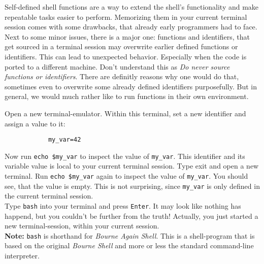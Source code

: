
\begin{challenge}

    \begin{chadescription}
        Self-defined shell functions are a way to extend the shell's functionality and make repeatable tasks easier to perform.
        Memorizing them in your current terminal session comes with some drawbacks, that already early programmers had to face.
        Next to some minor issues, there is a major one: functions and identifiers, that get sourced in a terminal session may overwrite earlier defined functions or identifiers.
        This can lead to unexpected behavior.
        Especially when the code is ported to a different machine.
        Don't understand this as \textit{Do never source functions or identifiers}.
        There are definitly reasons why one would do that, sometimes even to overwrite some already defined identifiers purposefully.
        But in general, we would much rather like to run functions in their own environment.
    \end{chadescription}
    \begin{task}
        Open a new terminal-emulator.
        Within this terminal, set a new identifier and assign a value to it:
        \begin{lstlisting}
            my_var=42
        \end{lstlisting}
        Now run \texttt{echo \$my_var} to inspect the value of \texttt{my_var}.
        This identifier and its variable value is local to your current terminal session.
        Type exit and open a new terminal.
        Run \texttt{echo \$my_var} again to inspect the value of \texttt{my_var}.
        You should see, that the value is empty. 
        This is not surprising, since \texttt{my_var} is only defined in the current terminal session.\\
        Type \texttt{bash} into your terminal and press \texttt{Enter}.
        It may look like nothing has happend, but you couldn't be further from the truth!
        Actually, you just started a new terminal-session, within your current session. 
        \\
        \textbf{Note: }\texttt{bash} is shorthand for \textit{Bourne Again Shell}.
        This is a shell-program that is based on the original \textit{Bourne Shell} and more or less the standard command-line interpreter.

\end{task}
\end{challenge}

